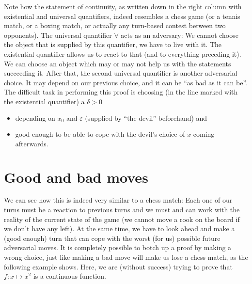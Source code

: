 \documentclass[11pt]{article}
\theoremstyle{plain}
\theoremstyle{definition}
\theoremstyle{remark}
\numberwithin{equation}{section}
\newcommand{\eps}{\varepsilon}
\begin{document}

Note how the statement of continuity, as written down in the right column with existential and universal quantifiers, indeed resembles a chess game (or a tennis match, or a boxing match, or actually any turn-based contest between two opponents). The universal quantifier $\forall$ acts as an adversary: We cannot choose the object that is supplied by this quantifier, we have to live with it. The existential quantifier allows us to react to that (and to everything preceding it). We can choose an object which may or may not help us with the statements succeeding it. After that, the second universal quantifier is another adversarial choice. It may depend on our previous choice, and it can be ``as bad as it can be''. The difficult task in performing this proof is choosing (in the line marked with the existential quantifier) a $\delta > 0$
\begin{itemize}
    \item depending on $x_0$ and $\eps$ (supplied by ``the devil'' beforehand) and
    \item good enough to be able to cope with the devil's choice of $x$ coming afterwards.
\end{itemize}
\section{Good and bad moves}
We can see how this is indeed very similar to a chess match: Each one of our turns must be a reaction to previous turns and we must and can work with the reality of the current state of the game (we cannot move a rook on the board if we don't have any left). At the same time, we have to look ahead and make a (good enough) turn that can cope with the worst (for us) possible future adversarial moves. It is completely possible to botch up a proof by making a wrong choice, just like making a bad move will make us lose a chess match, as the following example shows. Here, we are (without success) trying to prove that $f:x\mapsto x^2$ is a continuous function.
\end{document}
